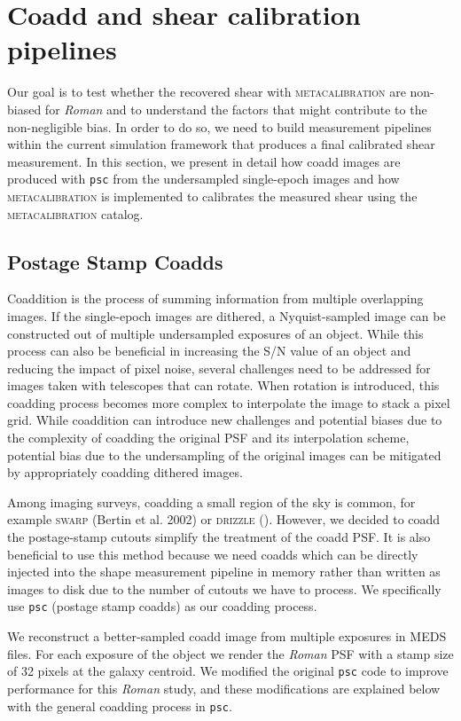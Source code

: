 \documentclass[fleqn,usenatbib]{mnras}
\begin{document}
\section{Coadd and shear calibration pipelines}
\label{sec:methods}
Our goal is to test whether the recovered shear with \textsc{metacalibration} are non-biased for \emph{Roman} and to understand the factors that might contribute to the non-negligible bias. In order to do so, we need to build measurement pipelines within the current simulation framework that produces a final calibrated shear measurement. In this section, we present in detail how coadd images are produced with \texttt{psc} from the undersampled single-epoch images and how \textsc{metacalibration} is implemented to calibrates the measured shear using the \textsc{metacalibration} catalog. 


\subsection{Postage Stamp Coadds}
\label{subsec:psc}
Coaddition is the process of summing information from multiple overlapping images. If the single-epoch images are dithered, a Nyquist-sampled image can be constructed out of multiple undersampled exposures of an object. While this process can also be beneficial in increasing the S/N value of an object and reducing the impact of pixel noise, several challenges need to be addressed for images taken with telescopes that can rotate. When rotation is introduced, this coadding process becomes more complex to interpolate the image to stack a pixel grid. While coaddition can introduce new challenges and potential biases due to the complexity of coadding the original PSF and its interpolation scheme, potential bias due to the undersampling of the original images can be mitigated by appropriately coadding dithered images. 

Among imaging surveys, coadding a small region of the sky is common, for example \textsc{swarp} (Bertin et al. 2002) or \textsc{drizzle} (\citealt{2002PASP..114..144F}). However, we decided to coadd the postage-stamp cutouts simplify the treatment of the coadd PSF. It is also beneficial to use this method because we need coadds which can be directly injected into the shape measurement pipeline in memory rather than written as images to disk due to the number of cutouts we have to process. We specifically use \texttt{psc} (postage stamp coadds) as our coadding process.

We reconstruct a better-sampled coadd image from multiple exposures in MEDS files. For each exposure of the object we render the \emph{Roman} PSF with a stamp size of 32 pixels at the galaxy centroid. We modified the original \texttt{psc} code to improve performance for this \emph{Roman} study, and these modifications are explained below with the general coadding process in \texttt{psc}. 
\end{document}
